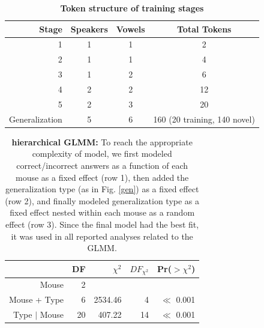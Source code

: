 \begin{table}
\label{trainsteps}
\caption{\textbf{Token structure of training stages}}
\begin{tabularx}{\linewidth}{rccc}
\toprule
Stage & Speakers & Vowels & Total Tokens\\
\midrule
1 & 1 & 1 & 2\\
2 & 1 & 1 & 4\\
3 & 1 & 2 & 6\\
4 & 2 & 2 & 12\\
5 & 2 & 3 & 20\\
Generalization & 5 & 6 & 160 (20 training, 140 novel)\\
\bottomrule
\end{tabularx}

\end{table}

\vspace{1in}

\begin{table}
\label{hiertab}
\caption{\textbf{hierarchical GLMM:} To reach the appropriate complexity of model, we first modeled correct/incorrect answers as a function of each mouse as a fixed effect (row 1), then added the generalization type (as in Fig. \ref{gen}) as a fixed effect (row 2), and finally modeled generalization type as a fixed effect nested within each mouse as a random effect (row 3). Since the final model had the best fit, it was used in all reported analyses related to the GLMM.}
\begin{tabularx}{\linewidth}{rrrrr}
  \hline
 & DF & $\chi^2$ & $DF_{\chi^2}$ & Pr($>\chi^2$) \\ 
  \hline
Mouse & 2 &  &  &  \\ 
  Mouse + Type & 6 & 2534.46 & 4 & $\ll$ 0.001 \\ 
  Type $|$ Mouse & 20 & 407.22 & 14 & $\ll$ 0.001 \\ 
   \hline
\end{tabularx}

\end{table}
